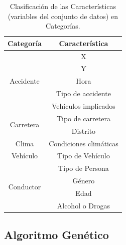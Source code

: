 


\begin{table}[H]
	\centering
	
	\begin{tabular}{ |c|c| }
		\hline
		\textbf{Categoría} & \textbf{Característica} \\
		\hline
		\hline
		\multirow{5}{*}{Accidente} & X \\
		& Y \\
		& Hora \\
		& Tipo de accidente \\
		& Vehículos implicados \\
		\hline
		\hline
		\multirow{2}{*}{Carretera} & Tipo de carretera \\
		& Distrito \\
		\hline
		\hline
		Clima & Condiciones climáticas \\
		\hline
		\hline
		Vehículo & Tipo de Vehículo \\
		\hline
		\hline
		\multirow{4}{*}{Conductor}  & Tipo de Persona \\
		& Género \\
		& Edad \\
		& Alcohol o Drogas \\
		\hline
		\hline
	\end{tabular}
	
	\caption{Clasificación de las Características (variables del conjunto de datos) en Categorías.}
	\label{JC}
\end{table}



\subsection*{Algoritmo Genético}



